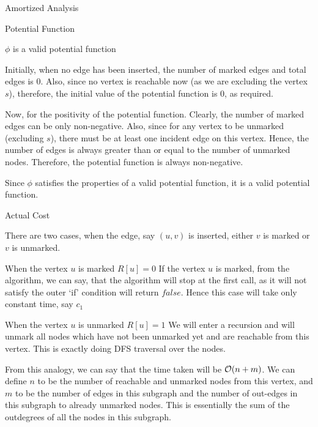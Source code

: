 \documentclass{article}
\begin{document}
\begin{question}
\begin{qsection}{Amortized Analysis}
\begin{qsubsection}{Potential Function}
			\begin{qproof}{$\phi$ is a valid potential function}

				Initially, when no edge has been inserted, the number of marked edges and total edges is 0. Also, since no vertex is reachable now (as we are excluding the vertex $s$), therefore, the initial value of the potential function is 0, as required. \br%

				Now, for the positivity of the potential function. Clearly, the number of marked edges can be only non-negative. Also, since for any vertex to be unmarked (excluding $s$), there must be at least one incident edge on this vertex. Hence, the number of edges is always greater than or equal to the number of unmarked nodes. Therefore, the potential function is always non-negative.

			\end{qproof}

			Since $\phi$ satisfies the properties of a valid potential function, it is a valid potential function.

		\end{qsubsection}

		\clearpage

		\begin{qsubsection}{Actual Cost}

			There are two cases, when the edge, say $(u, v)$ is inserted, either $v$ is marked or $v$ is unmarked.

			\begin{qcase}{1}{When the vertex $u$ is marked  $R[u] = 0$}
				If the vertex $u$ is marked, from the algorithm, we can say, that the algorithm will stop at the first call, as it will not satisfy the outer `if' condition will return $false$. Hence this case will take only constant time, say $c_1$
			\end{qcase}

			\begin{qcase}{2}{When the vertex $u$ is unmarked  $R[u] = 1$}
				We will enter a recursion and will unmark all nodes which have not been unmarked yet and are reachable from this vertex. This is exactly doing DFS traversal over the nodes. \br%

				From this analogy, we can say that the time taken will be $\mathcal{O}(n + m)$. We can define $n$ to be the number of reachable and unmarked nodes from this vertex, and $m$ to be the number of edges in this subgraph and the number of out-edges in this subgraph to already unmarked nodes. This is essentially the sum of the outdegrees of all the nodes in this subgraph. \br%


\end{qcase}
\end{qsubsection}
\end{qsection}
\end{question}
\end{document}
